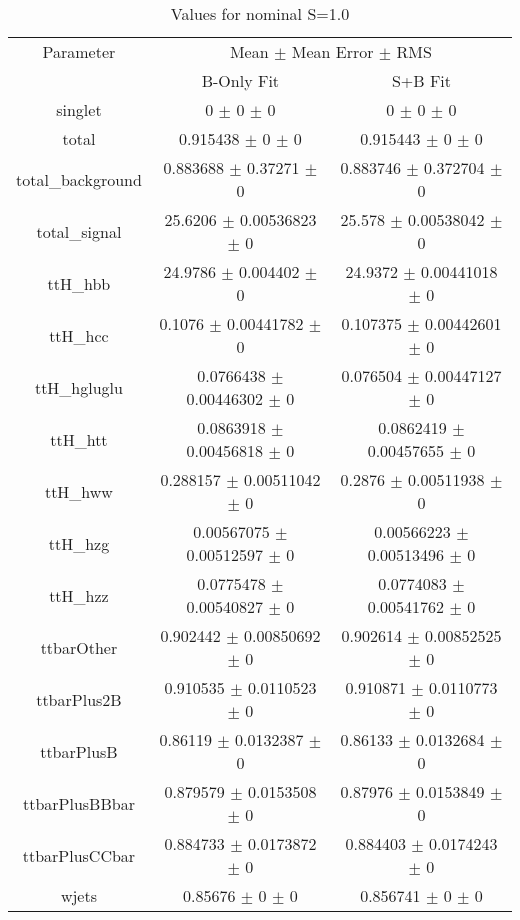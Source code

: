 \begin{table}
\centering
\caption{Values for nominal S=1.0}
\begin{tabular}{ccc}
\toprule
Parameter & \multicolumn{2}{c}{Mean $\pm$ Mean Error $\pm$ RMS}\\
 & B-Only Fit & S+B Fit\\
\midrule
singlet & \num{0} $\pm$ \num{0} $\pm$ \num{0} & \num{0} $\pm$ \num{0} $\pm$ \num{0}\\
total & \num{0.915438} $\pm$ \num{0} $\pm$ \num{0} & \num{0.915443} $\pm$ \num{0} $\pm$ \num{0}\\
total\_background & \num{0.883688} $\pm$ \num{0.37271} $\pm$ \num{0} & \num{0.883746} $\pm$ \num{0.372704} $\pm$ \num{0}\\
total\_signal & \num{25.6206} $\pm$ \num{0.00536823} $\pm$ \num{0} & \num{25.578} $\pm$ \num{0.00538042} $\pm$ \num{0}\\
ttH\_hbb & \num{24.9786} $\pm$ \num{0.004402} $\pm$ \num{0} & \num{24.9372} $\pm$ \num{0.00441018} $\pm$ \num{0}\\
ttH\_hcc & \num{0.1076} $\pm$ \num{0.00441782} $\pm$ \num{0} & \num{0.107375} $\pm$ \num{0.00442601} $\pm$ \num{0}\\
ttH\_hgluglu & \num{0.0766438} $\pm$ \num{0.00446302} $\pm$ \num{0} & \num{0.076504} $\pm$ \num{0.00447127} $\pm$ \num{0}\\
ttH\_htt & \num{0.0863918} $\pm$ \num{0.00456818} $\pm$ \num{0} & \num{0.0862419} $\pm$ \num{0.00457655} $\pm$ \num{0}\\
ttH\_hww & \num{0.288157} $\pm$ \num{0.00511042} $\pm$ \num{0} & \num{0.2876} $\pm$ \num{0.00511938} $\pm$ \num{0}\\
ttH\_hzg & \num{0.00567075} $\pm$ \num{0.00512597} $\pm$ \num{0} & \num{0.00566223} $\pm$ \num{0.00513496} $\pm$ \num{0}\\
ttH\_hzz & \num{0.0775478} $\pm$ \num{0.00540827} $\pm$ \num{0} & \num{0.0774083} $\pm$ \num{0.00541762} $\pm$ \num{0}\\
ttbarOther & \num{0.902442} $\pm$ \num{0.00850692} $\pm$ \num{0} & \num{0.902614} $\pm$ \num{0.00852525} $\pm$ \num{0}\\
ttbarPlus2B & \num{0.910535} $\pm$ \num{0.0110523} $\pm$ \num{0} & \num{0.910871} $\pm$ \num{0.0110773} $\pm$ \num{0}\\
ttbarPlusB & \num{0.86119} $\pm$ \num{0.0132387} $\pm$ \num{0} & \num{0.86133} $\pm$ \num{0.0132684} $\pm$ \num{0}\\
ttbarPlusBBbar & \num{0.879579} $\pm$ \num{0.0153508} $\pm$ \num{0} & \num{0.87976} $\pm$ \num{0.0153849} $\pm$ \num{0}\\
ttbarPlusCCbar & \num{0.884733} $\pm$ \num{0.0173872} $\pm$ \num{0} & \num{0.884403} $\pm$ \num{0.0174243} $\pm$ \num{0}\\
wjets & \num{0.85676} $\pm$ \num{0} $\pm$ \num{0} & \num{0.856741} $\pm$ \num{0} $\pm$ \num{0}\\
\bottomrule
\end{tabular}
\end{table}